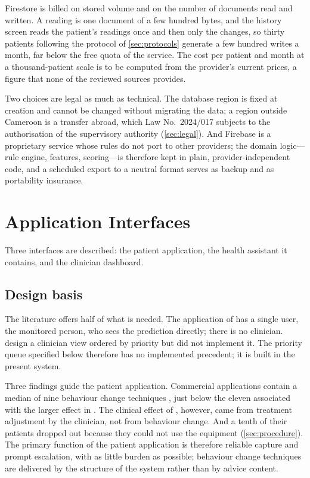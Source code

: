 Firestore is billed on stored volume and on the number of documents read and written. A reading is one document of a few hundred bytes, and the history screen reads the patient's readings once and then only the changes, so thirty patients following the protocol of \cref{sec:protocols} generate a few hundred writes a month, far below the free quota of the service. The cost per patient and month at a thousand-patient scale is to be computed from the provider's current prices, a figure that none of the reviewed sources provides.

Two choices are legal as much as technical. The database region is fixed at creation and cannot be changed without migrating the data; a region outside Cameroon is a transfer abroad, which Law No.~2024/017 subjects to the authorisation of the supervisory authority (\cref{sec:legal}). And Firebase is a proprietary service whose rules do not port to other providers; the domain logic---rule engine, features, scoring---is therefore kept in plain, provider-independent code, and a scheduled export to a neutral format serves as backup and as portability insurance.


\section{Application Interfaces}\label{sec:interfaces}

Three interfaces are described: the patient application, the health assistant it contains, and the clinician dashboard.

\subsection{Design basis}\label{sec:corpus-gap}\label{sec:app-argument}

The literature offers half of what is needed. The application of \textcite{efendi2025} has a single user, the monitored person, who sees the prediction directly; there is no clinician. \Textcite{yazdani2018} design a clinician view ordered by priority but did not implement it. The priority queue specified below therefore has no implemented precedent; it is built in the present system.

Three findings guide the patient application. Commercial applications contain a median of nine behaviour change techniques \parencite{alessa2019}, just below the eleven associated with the larger effect in \textcite{zhou2024}. The clinical effect of \textcite{mihevc2025}, however, came from treatment adjustment by the clinician, not from behaviour change. And a tenth of their patients dropped out because they could not use the equipment (\cref{sec:procedure}). The primary function of the patient application is therefore reliable capture and prompt escalation, with as little burden as possible; behaviour change techniques are delivered by the structure of the system rather than by advice content.

